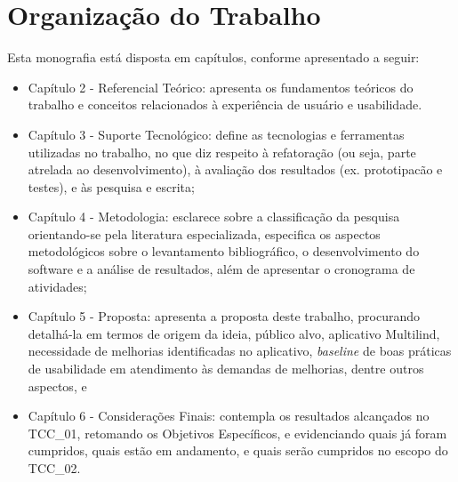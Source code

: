 \section{Organização do Trabalho}
\label{sec:OrganizacaodoTrabalho}

\begin{description}
    \item Esta monografia está disposta em capítulos, conforme apresentado a seguir:
          \begin{itemize}
              \item Capítulo 2 - Referencial Teórico: apresenta os fundamentos teóricos do trabalho e conceitos relacionados à experiência de usuário e usabilidade.

              \item Capítulo 3 - Suporte Tecnológico: define as tecnologias e ferramentas utilizadas no trabalho, no que diz respeito à refatoração (ou seja, parte
              atrelada ao desenvolvimento), à avaliação dos resultados (ex. prototipacão e testes), e às pesquisa e escrita;

              \item Capítulo 4 - Metodologia: esclarece sobre a classificação da pesquisa orientando-se pela literatura especializada, especifica os aspectos
              metodológicos sobre o levantamento bibliográfico, o desenvolvimento do software e a análise de resultados, além de apresentar o cronograma de atividades;

              \item Capítulo 5 - Proposta: apresenta a proposta deste trabalho, procurando detalhá-la em termos de origem da ideia, público alvo, aplicativo Multilind,
              necessidade de melhorias identificadas no aplicativo, \textit{baseline} de boas práticas de usabilidade em atendimento às demandas de melhorias, dentre
              outros aspectos, e

              \item Capítulo 6 - Considerações Finais: contempla os resultados alcançados no TCC\_01, retomando os Objetivos Específicos, e evidenciando quais já foram
              cumpridos, quais estão em andamento, e quais serão cumpridos no escopo do TCC\_02.
          \end{itemize}
\end{description}

